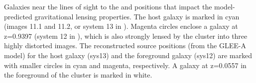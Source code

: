 \label{fig:LineOfSightLenses}
Galaxies near the lines of sight to the \spockone and \spocktwo
positions that impact the model-predicted gravitational lensing
properties.  The \spock host galaxy is marked in cyan (images 11.1 and
11.2, or system 13 in \citet{Caminha:2017}).  Magenta circles enclose
a galaxy at z=0.9397 (system 12 in \citet{Caminha:2017}), which is
also strongly lensed by the  cluster into three highly
distorted images.  The reconstructed source positions (from the GLEE-A
model) for the host galaxy (sys13) and the foreground galaxy (sys12)
are marked with smaller circles in cyan and magenta, respectively. A
galaxy at z=0.0557 in the foreground of the cluster is marked in
white.
